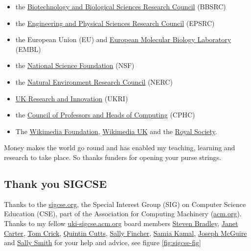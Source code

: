 \documentclass[
]{book}
\providecommand{\tightlist}{%
  \setlength{\itemsep}{0pt}\setlength{\parskip}{0pt}}
\begin{document}
\begin{itemize}
\tightlist
\item
  the \href{https://en.wikipedia.org/wiki/Biotechnology_and_Biological_Sciences_Research_Council}{Biotechnology and Biological Sciences Research Council} (BBSRC)
\item
  the \href{https://en.wikipedia.org/wiki/Engineering_and_Physical_Sciences_Research_Council}{Engineering and Physical Sciences Research Council} (EPSRC)
\item
  the European Union (EU) and \href{https://en.wikipedia.org/wiki/European_Molecular_Biology_Laboratory}{European Molecular Biology Laboratory} (EMBL)
\item
  the \href{https://en.wikipedia.org/wiki/National_Science_Foundation}{National Science Foundation} (NSF)
\item
  the \href{https://en.wikipedia.org/wiki/Natural_Environment_Research_Council}{Natural Environment Research Council} (NERC)
\item
  \href{https://en.wikipedia.org/wiki/UK_Research_and_Innovation}{UK Research and Innovation} (UKRI)
\item
  the \href{https://cphc.ac.uk/}{Council of Professors and Heads of Computing} (CPHC)
\item
  The \href{https://en.wikipedia.org/wiki/Wikimedia_Foundation}{Wikimedia Foundation}, \href{https://wikimedia.org.uk/}{Wikimedia UK} and the \href{https://en.wikipedia.org/wiki/Royal_Society}{Royal Society}.
\end{itemize}

Money makes the world go round and has enabled my teaching, learning and research to take place. So thanks funders for opening your purse strings. 🙏

\hypertarget{sigcse}{%
\subsection{Thank you SIGCSE}\label{sigcse}}

Thanks to the \href{https://www.sigcse.org}{sigcse.org}, the Special Interest Group (SIG) on Computer Science Education (CSE), part of the Association for Computing Machinery (\href{https://www.acm.org/}{acm.org}). Thanks to my fellow \href{https://uki-sigcse.acm.org/}{uki-sigcse.acm.org} board members \href{https://www.dur.ac.uk/research/directory/staff/?mode=staff\&id=106}{Steven Bradley}, \href{https://www.kent.ac.uk/computing/people/3101/carter-janet}{Janet Carter}, \href{https://proftomcrick.com/}{Tom Crick}, \href{https://www.gla.ac.uk/schools/computing/staff/quintincutts/}{Quintin Cutts}, \href{https://en.wikipedia.org/wiki/Sally_Fincher}{Sally Fincher}, \href{https://www.advance-he.ac.uk/ntfs/dr-samia-kamal}{Samia Kamal}, \href{https://www.gla.ac.uk/schools/computing/staff/josephmaguire/}{Joseph McGuire} and \href{https://www.napier.ac.uk/people/sally-smith}{Sally Smith} for your help and advice, see figure \ref{fig:sigcse-fig}
\end{document}
